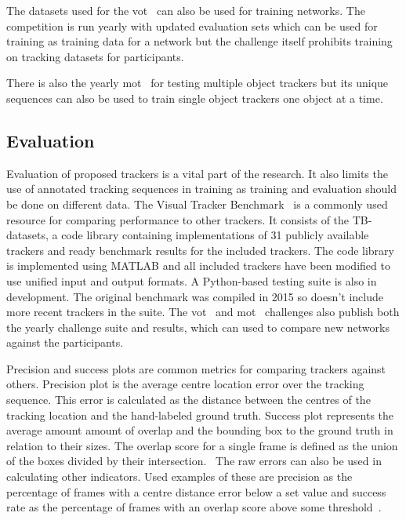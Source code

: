 The datasets used for the \ac{vot}~\cite{VOT} can also be used for training networks. The competition
is run yearly with updated evaluation sets which can be used for training as training
data for a network but the challenge itself prohibits training on tracking datasets for
participants.

There is also the yearly \ac{mot}~\cite{MOT16} for testing multiple object trackers but
its unique sequences can also be used to train single object trackers one object at a
time.

\subsection{Evaluation}
Evaluation of proposed trackers is a vital part of the research. It also limits the use
of annotated tracking sequences in training as training and evaluation should be done
on different data.
The Visual Tracker Benchmark~\cite{VTB} is a commonly used resource for comparing
performance to other trackers. It consists of the TB-datasets, a code library containing
implementations of 31 publicly available trackers and ready benchmark results for the
included trackers. The code library is implemented using MATLAB and all included trackers
have been modified to use unified input and output formats. A Python-based testing suite
is also in development. The original benchmark was compiled in 2015 so doesn't include
more recent trackers in the suite. The \ac{vot}~\cite{VOT} and \ac{mot}~\cite{MOT16}
challenges also publish both the yearly challenge suite and results, which can used to
compare new networks against the participants.

Precision and success plots are common metrics for comparing trackers against others.
Precision plot is the average centre location error over the tracking sequence. This
error is calculated as the distance between the centres of the tracking location and
the hand-labeled ground truth. Success plot represents the average amount amount of
overlap and the bounding box to the ground truth in relation to their sizes. The overlap
score for a single frame is defined as the union of the boxes divided by their intersection.~\cite{OT_BENCH}
The raw errors can also be used in calculating other indicators. Used examples of these
are precision as the percentage of frames with a centre distance error below a set value
and success rate as the percentage of frames with an overlap score above some threshold~\cite{DEEPTRACK}.
